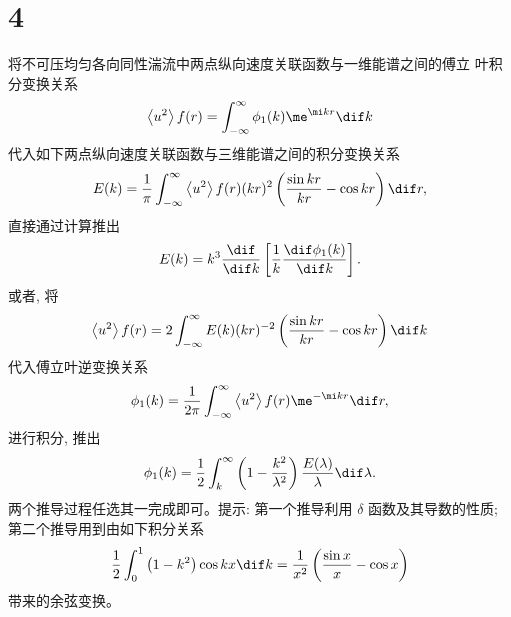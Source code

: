 \documentclass[12pt,a4]{ctexart}
\begin{document}
\section{4}

将不可压均匀各向同性湍流中两点纵向速度关联函数与一维能谱之间的傅立 叶积分变换关系
\begin{equation}
   \left\langle u^{2}\right\rangle f(r)=\int_{-\infty}^{\infty} \phi_{1}(k) \me^{\mi k r}\dif k
\end{equation}
代入如下两点纵向速度关联函数与三维能谱之间的积分变换关系
\begin{equation}
   E(k)=\frac{1}{\pi} \int_{-\infty}^{\infty}\left\langle u^{2}\right\rangle f(r)(k r)^{2}\left(\frac{\sin k r}{k r}-\cos k r\right) \dif r,
\end{equation}
直接通过计算推出
\begin{equation}
   E(k)=k^{3} \frac{\dif}{\dif k}\left[\frac{1}{k} \frac{\dif \phi_{1}(k)}{\dif k}\right].
\end{equation}
或者, 将
\begin{equation}
   \left\langle u^{2}\right\rangle f(r)=2 \int_{-\infty}^{\infty} E(k)(k r)^{-2}\left(\frac{\sin k r}{k r}-\cos k r\right)\dif k
   \label{eq:41}
\end{equation}
代入傅立叶逆变换关系
\begin{equation}
   \phi_{1}(k)=\frac{1}{2 \pi} \int_{-\infty}^{\infty}\left\langle u^{2}\right\rangle f(r) \me^{-\mi k r} \dif r,
   \label{eq:42}
\end{equation}
进行积分, 推出
\begin{equation}
   \phi_{1}(k)=\frac{1}{2} \int_{k}^{\infty}\left(1-\frac{k^{2}}{\lambda^{2}}\right) \frac{E(\lambda)}{\lambda} \dif \lambda.
\end{equation}
两个推导过程任选其一完成即可。提示: 第一个推导利用 $\delta$ 函数及其导数的性质; 第二个推导用到由如下积分关系
\begin{equation}
   \frac{1}{2} \int_{0}^{1}\left(1-k^{2}\right) \cos k x \dif k=\frac{1}{x^{2}}\left(\frac{\sin x}{x}-\cos x\right)
   \label{eq:43}
\end{equation}
带来的余弦变换。
\end{document}
